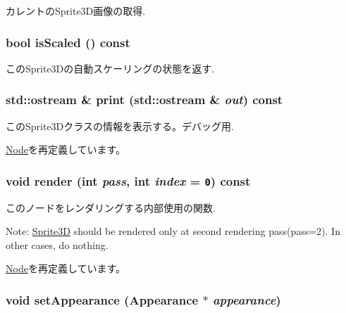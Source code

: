 カレントのSprite3D画像の取得. \hypertarget{classm3g_1_1Sprite3D_8e3e7fa70e1d3f2342580991105779f5}{
\subsubsection[{isScaled}]{\setlength{\rightskip}{0pt plus 5cm}bool isScaled () const}}
\label{classm3g_1_1Sprite3D_8e3e7fa70e1d3f2342580991105779f5}


このSprite3Dの自動スケーリングの状態を返す. \hypertarget{classm3g_1_1Sprite3D_6fea17fa1532df3794f8cb39cb4f911f}{
\subsubsection[{print}]{\setlength{\rightskip}{0pt plus 5cm}std::ostream \& print (std::ostream \& {\em out}) const}}
\label{classm3g_1_1Sprite3D_6fea17fa1532df3794f8cb39cb4f911f}


このSprite3Dクラスの情報を表示する。デバッグ用. 

\hyperlink{classm3g_1_1Node_6fea17fa1532df3794f8cb39cb4f911f}{Node}を再定義しています。\hypertarget{classm3g_1_1Sprite3D_1efcb1973989d9963d5bd6d03065d389}{
\subsubsection[{render}]{\setlength{\rightskip}{0pt plus 5cm}void render (int {\em pass}, \/  int {\em index} = {\tt 0}) const}}
\label{classm3g_1_1Sprite3D_1efcb1973989d9963d5bd6d03065d389}


このノードをレンダリングする内部使用の関数.

Note: \hyperlink{classm3g_1_1Sprite3D}{Sprite3D} should be rendered only at second rendering pass(pass=2). In other cases, do nothing. 

\hyperlink{classm3g_1_1Node_1efcb1973989d9963d5bd6d03065d389}{Node}を再定義しています。\hypertarget{classm3g_1_1Sprite3D_b9b44bad4241635062ed66437c9bae48}{
\subsubsection[{setAppearance}]{\setlength{\rightskip}{0pt plus 5cm}void setAppearance ({\bf Appearance} $\ast$ {\em appearance})}}
\label{classm3g_1_1Sprite3D_b9b44bad4241635062ed66437c9bae48}


